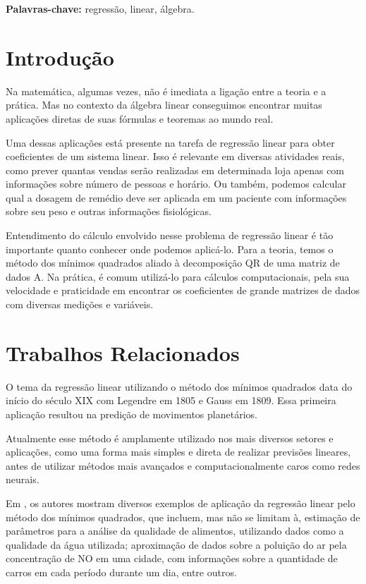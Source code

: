 \documentclass[a4paper, 12pt]{article}
\theoremstyle{definition}
\theoremstyle{remark}
\begin{document}
\textbf{Palavras-chave:} regressão, linear, álgebra. 


\newpage

\tableofcontents

\newpage

\section{Introdução}

Na matemática, algumas vezes, não é imediata a ligação entre a teoria e a prática. Mas no contexto da álgebra linear conseguimos encontrar muitas aplicações diretas de suas fórmulas e teoremas ao mundo real.

Uma dessas aplicações está presente na tarefa de regressão linear para obter coeficientes de um sistema linear. Isso é relevante em diversas atividades reais, como prever quantas vendas serão realizadas em determinada loja apenas com informações sobre número de pessoas e horário. Ou também, podemos calcular qual a dosagem de remédio deve ser aplicada em um paciente com informações sobre seu peso e outras informações fisiológicas.

Entendimento do cálculo envolvido nesse problema de regressão linear é tão importante quanto conhecer onde podemos aplicá-lo. Para a teoria, temos o método dos mínimos quadrados aliado à decomposição QR de uma matriz de dados A. Na prática, é comum utilizá-lo para cálculos computacionais, pela sua velocidade e praticidade em encontrar os coeficientes de grande matrizes de dados com diversas medições e variáveis.

\newpage
\section{Trabalhos Relacionados}

O tema da regressão linear utilizando o método dos mínimos quadrados data do início do século XIX com Legendre em 1805 e Gauss em 1809. Essa primeira aplicação resultou na predição de movimentos planetários. \cite{history}

Atualmente esse método é amplamente utilizado nos mais diversos setores e aplicações, como uma forma mais simples e direta de realizar previsões lineares, antes de utilizar métodos mais avançados e computacionalmente caros como redes neurais.

Em \cite{linear-applications}, os autores mostram diversos exemplos de aplicação da regressão linear pelo método dos mínimos quadrados, que incluem, mas não se limitam à, estimação de parâmetros para a análise da qualidade de alimentos, utilizando dados como a qualidade da água utilizada; aproximação de dados sobre a poluição do ar pela concentração de NO em uma cidade, com informações sobre a quantidade de carros em cada período durante um dia, entre outros.
\end{document}
